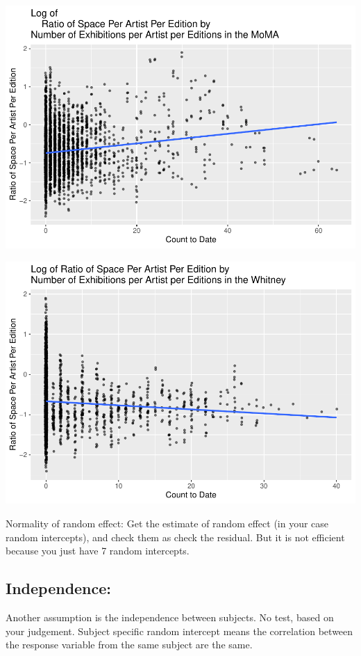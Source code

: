 \documentclass[
  letterpaper,
  DIV=11,
  numbers=noendperiod]{scrreprt}
\begin{document}
\includegraphics{Chapter2/Chapter2_files/figure-pdf/linearitymoma-1.pdf}

\includegraphics{Chapter2/Chapter2_files/figure-pdf/linearitywhitney-1.pdf}

Normality of random effect: Get the estimate of random effect (in your
case random intercepts), and check them as check the residual. But it is
not efficient because you just have 7 random intercepts.

\hypertarget{independence}{%
\subsection{Independence:}\label{independence}}

Another assumption is the independence between subjects. No test, based
on your judgement. Subject specific random intercept means the
correlation between the response variable from the same subject are the
same.
\end{document}
